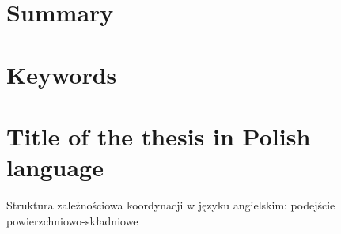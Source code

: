\documentclass[12pt]{report}
\begin{document}


\onehalfspacing

\pagestyle{empty}
\section*{\centering Summary}

\section*{\centering Keywords}

\section*{\centering Title of the thesis in Polish language}
Struktura zależnościowa koordynacji w języku angielskim: podejście powierzchniowo\hyp{}składniowe

%
%

\newlength{\treeheight}
\newlength{\treewidth}

\tableofcontents
\end{document}
